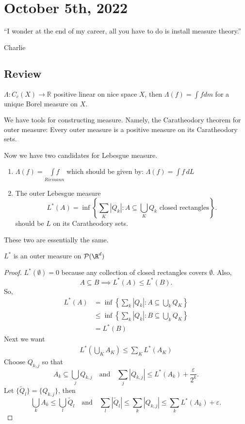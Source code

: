 \section{October 5th, 2022}

\epigraph{``I wonder at the end of my career, all you have to do is install measure theory.''}{Charlie}

\subsection*{Review}

\begin{theorem}[Riesz]
	$\Lambda : C_c (X) \to \mathbb{R}$ positive linear on nice space $X$, then $\Lambda(f) = \int f dm$ for a unique Borel measure on $X$.
\end{theorem}

We have tools for constructing measure. Namely, the Caratheodory theorem for outer measure: Every outer measure is a positive measure on its Caratheodory sets.

Now we have two candidates for Lebesgue measure.

\begin{enumerate}
	\item $\Lambda (f) = \underset{Riemann}{\int f}$
		which should be given by: $\Lambda(f) = \int f \,dL$
	\item The outer Lebesgue measure \[
		L^* (A) = \inf \left\{\sum_K |Q_k| : A \subseteq \bigcup_{K} Q_k \text{ closed rectangles}\right\}.
	\]
  should be $L$ on its Caratheodory sets.
\end{enumerate}

These two are essentially the same.

\begin{lemma}
	$L^*$ is an outer measure on $\mathcal{P}(\R^d)$
\end{lemma}

\begin{proof}
	$L^* (\emptyset)= 0$ because any collection of closed rectangles covers $\emptyset$. Also,
	\[
		A \subseteq B \implies L^*(A) \leq L^*(B).
	\]
  So,
	 \begin{align*}
	L^*(A) & = \inf \left\{\sum_{k} |Q_k| : A \subseteq \bigcup_{k} Q_K \right\} \\
         & \leq \inf\left\{\sum_{k} |Q_k| : B \subseteq \bigcup_{k} Q_K \right\} \\
         & = L^*(B)
	\end{align*}
	Next we want
	\begin{align*}
	L^* \left( \bigcup_{K} A_K \right) \leq \sum_{K} L^* (A_K)
	\end{align*}
	Choose $Q_{k,j}$ so that
	\[
		A_k \subseteq \bigcup_{j} Q_{k,j} \quad \text{and} \quad \sum_{j} | Q_{k,j} | \leq L^* (A_{k}) + \frac{\varepsilon}{2^{k}}.
	\]
	Let $\{\tilde{Q}_{l}\} = \{Q_{k,j}\}$, then
	\[
		\bigcup_{k}A_{k} \leq \bigcup_{l} \tilde{Q}_{l} \quad \text{and} \quad
		\sum_{l} | \tilde{Q}_{l} | \leq \sum_{k} |Q_{k,j} | \leq \sum_{k} L^* (A_k) + \varepsilon.
	\]
\end{proof}

